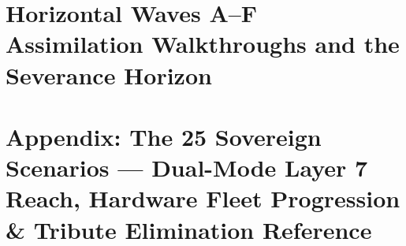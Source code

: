\documentclass[11pt,a4paper]{book}
\newif\ifusebiblatex
\DeclareRobustCommand{\_}{\ifmmode\text{\symbol{95}}\else\symbol{95}\allowbreak\fi}
\theoremstyle{plain}
\theoremstyle{definition}
\begin{document}
\part{Horizontal Waves A--F Assimilation Walkthroughs and the Severance Horizon}






\appendix
\part{Appendix: The 25 Sovereign Scenarios --- Dual-Mode Layer 7 Reach, Hardware Fleet Progression \& Tribute Elimination Reference}



























\backmatter
\ifusebiblatex
    \printbibliography[heading=bibintoc]
\else
    \cleardoublepage
    
    
\fi
\end{document}
